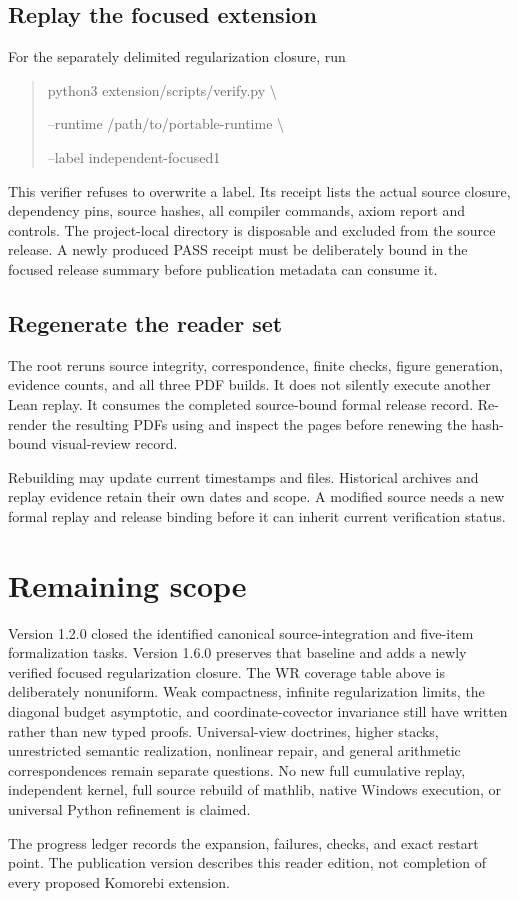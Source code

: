 \documentclass[11pt]{article}
\begin{document}
\subsection{Replay the focused extension}
For the separately delimited regularization closure, run
\begin{quote}\small\ttfamily
python3 extension/scripts/verify.py \textbackslash\par
\hspace*{1em}--runtime /path/to/portable-runtime \textbackslash\par
\hspace*{1em}--label independent-focused1
\end{quote}
This verifier refuses to overwrite a label. Its receipt lists the actual source closure, dependency pins, source hashes, all compiler commands, axiom report and controls. The project-local  directory is disposable and excluded from the source release. A newly produced PASS receipt must be deliberately bound in the focused release summary before publication metadata can consume it.

\subsection{Regenerate the reader set}
The root  reruns source integrity, correspondence, finite checks, figure generation, evidence counts, and all three PDF builds. It does not silently execute another Lean replay. It consumes the completed source-bound formal release record. Re-render the resulting PDFs using  and inspect the pages before renewing the hash-bound visual-review record.

Rebuilding may update current timestamps and files. Historical archives and replay evidence retain their own dates and scope. A modified source needs a new formal replay and release binding before it can inherit current verification status.

\section{Remaining scope}
Version 1.2.0 closed the identified canonical source-integration and five-item formalization tasks. Version 1.6.0 preserves that baseline and adds a newly verified focused regularization closure. The WR coverage table above is deliberately nonuniform. Weak compactness, infinite regularization limits, the diagonal budget asymptotic, and coordinate-covector invariance still have written rather than new typed proofs. Universal-view doctrines, higher stacks, unrestricted semantic realization, nonlinear repair, and general arithmetic correspondences remain separate questions. No new full cumulative replay, independent kernel, full source rebuild of mathlib, native Windows execution, or universal Python refinement is claimed.

The progress ledger records the expansion, failures, checks, and exact restart point. The publication version describes this reader edition, not completion of every proposed Komorebi extension.
\end{document}
